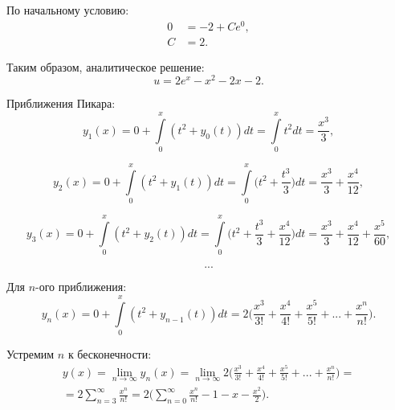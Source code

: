 \begin{enumerate}[label=\textbf{\arabic*})]
        По начальному условию:
        \begin{equation*}
            \begin{aligned}
                0 &= -2 + Ce^0,\\
                C &= 2.
            \end{aligned}
        \end{equation*}

        Таким образом, аналитическое решение:
        \begin{equation}\label{eq:13}
            u = 2e^x - x^2 - 2x - 2.
        \end{equation}

        Приближения Пикара:
        \begin{equation*}
            y_1(x) = 0 + \int\limits_0^x(t^2 + y_0(t))dt = \int\limits_0^x t^2
            dt = \frac{x^3}{3},
        \end{equation*}

        \begin{equation*}
            y_2(x) = 0 + \int\limits_0^x(t^2 + y_1(t))dt = \int\limits_0^x
            \bigg(t^2 + \frac{t^3}{3}\bigg)dt = \frac{x^3}{3} + \frac{x^4}{12},
        \end{equation*}

        \begin{equation*}
            y_3(x) = 0 + \int\limits_0^x(t^2 + y_2(t))dt = \int\limits_0^x
            \bigg(t^2 + \frac{t^3}{3} + \frac{x^4}{12}\bigg)dt = \frac{x^3}{3} +
            \frac{x^4}{12} + \frac{x^5}{60},
        \end{equation*}
        
        \begin{equation*}
            ...
        \end{equation*}

        Для $n$-ого приближения:
        \begin{equation*}
            y_n(x) = 0 + \int\limits_0^x(t^2 + y_{n-1}(t))dt =
            2\bigg(\frac{x^3}{3!}
            + \frac{x^4}{4!} + \frac{x^5}{5!} + ... + \frac{x^n}{n!}\bigg).
        \end{equation*}

        Устремим $n$ к бесконечности:
        \begin{equation*}
            \begin{split}
                y(x) = \lim_{n \to \infty} y_n(x) = \lim_{n \to \infty}
                2\bigg(\frac{x^3}{3!} + \frac{x^4}{4!} + \frac{x^5}{5!} + ... +
                \frac{x^n}{n!}\bigg) = \\ = 2 \sum\limits_{n=3}^{\infty}
                \frac{x^n}{n!} = 2\bigg( \sum\limits_{n=0}^{\infty} \frac{x^n}{n!} -
                1 - x - \frac{x^2}{2}\bigg).
            \end{split}
        \end{equation*}


\end{enumerate}
